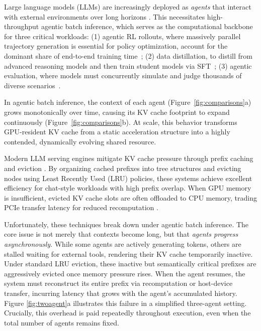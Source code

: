 Large language models (LLMs) are increasingly deployed as \emph{agents} that interact with external environments over long horizons \cite{nex,rollpacker}. This necessitates high-throughput agentic batch inference, which serves as the computational backbone for three critical workloads: (1) agentic RL rollouts, where massively parallel trajectory generation is essential for policy optimization, account for the dominant share of end-to-end training time~\cite{openrlhf, Laminar,respec}; (2) data distillation, to distill from advanced reasoning models and then train student models via SFT~\cite{rl_distill}; (3) agentic evaluation, where models must concurrently simulate and judge thousands of diverse scenarios~\cite{agentjudge}. 

In agentic batch inference, the context of each agent (Figure~\ref{fig:comparisons}a) grows monotonically over time, causing its KV cache footprint to expand continuously (Figure~\ref{fig:comparisons}b).
At scale, this behavior transforms GPU-resident KV cache from a static acceleration structure into a highly contended, dynamically evolving shared resource. 

Modern LLM serving engines mitigate KV cache pressure through prefix caching and eviction \cite{chunkattention,hydragen,promptcache}.
By organizing cached prefixes into tree structures \cite{sglang} and evicting nodes using Least Recently Used (LRU) policies, these systems achieve excellent efficiency for chat-style workloads with high prefix overlap.
When GPU memory is insufficient, evicted KV cache slots are often offloaded to CPU memory, trading PCIe transfer latency for reduced recomputation \cite{mooncake,preble,promptcache}.

Unfortunately, these techniques break down under agentic batch inference. 
The core issue is not merely that contexts become long, but that \emph{agents progress asynchronously}.
While some agents are actively generating tokens, others are stalled waiting for external tools, rendering their KV cache temporarily inactive.
Under standard LRU eviction, these inactive but semantically critical prefixes are aggressively evicted once memory pressure rises.
When the agent resumes, the system must reconstruct its entire prefix via recomputation or host-device transfer, incurring latency that grows with the agent’s accumulated history. Figure \ref{fig:twoagent}a illustrates this failure in a simplified three-agent setting.
Crucially, this overhead is paid repeatedly throughout execution, even when the total number of agents remains fixed.

